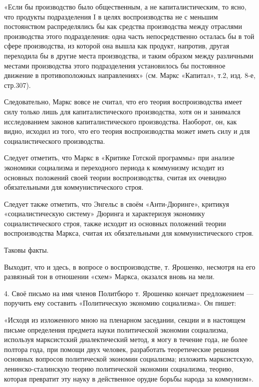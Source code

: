 \documentclass[12pt, a4paper, openany]{book}
\begin{document}
«Если бы производство было общественным, а не капиталистическим, то ясно, что продукты подразделения I в целях воспроизводства не с меньшим постоянством распределялись бы как средства производства между отраслями производства этого подразделения: одна часть непосредственно осталась бы в той сфере производства, из которой она вышла как продукт, напротив, другая переходила бы в другие места производства, и таким образом между различными местами производства этого подразделения установилось бы постоянное движение в противоположных направлениях» (см. Маркс «Капитал», т.2, изд. 8-е, стр.307).



Следовательно, Маркс вовсе не считал, что его теория воспроизводства имеет силу только лишь для капиталистического производства, хотя он и занимался исследованием законов капиталистического производства. Наоборот, он, как видно, исходил из того, что его теория воспроизводства может иметь силу и для социалистического производства.



Следует отметить, что Маркс в «Критике Готской программы» при анализе экономики социализма и переходного периода к коммунизму исходит из основных положений своей теории воспроизводства, считая их очевидно обязательными для коммунистического строя.



Следует также отметить, что Энгельс в своём «Анти-Дюринге», критикуя «социалистическую систему» Дюринга и характеризуя экономику социалистического строя, также исходит из основных положений теории воспроизводства Маркса, считая их обязательными для коммунистического строя.



Таковы факты.



Выходит, что и здесь, в вопросе о воспроизводстве, т. Ярошенко, несмотря на его развязный тон в отношении «схем» Маркса, оказался вновь на мели.



4. Своё письмо на имя членов Политбюро т. Ярошенко кончает предложением — поручить ему составить «Политическую экономию социализма». Он пишет:



«Исходя из изложенного мною на пленарном заседании, секции и в настоящем письме определения предмета науки политической экономии социализма, используя марксистский диалектический метод, я могу в течение года, не более полтора года, при помощи двух человек, разработать теоретические решения основных вопросов политической экономии социализма; изложить марксистскую, ленинско-сталинскую теорию политической экономии социализма, теорию, которая превратит эту науку в действенное орудие борьбы народа за коммунизм».
\end{document}
